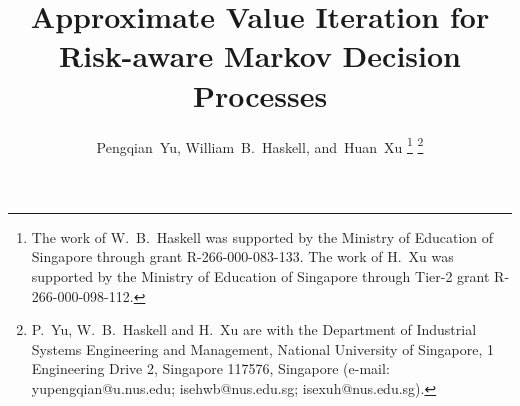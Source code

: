 \documentclass[12pt,technote,onecolumn]{IEEEtran}
\begin{document}
%
\title{Approximate Value Iteration for Risk-aware Markov Decision Processes}
%
%
%

\author{Pengqian~Yu,
        William~B.~Haskell,
        and~Huan~Xu%
\thanks{The work of W.~B.~Haskell was supported by the Ministry of Education of Singapore through grant R-266-000-083-133. The work of H.~Xu was supported by the Ministry of Education of Singapore through Tier-2 grant R-266-000-098-112.}        
\thanks{P.~Yu, W.~B.~Haskell and H.~Xu are with the Department of Industrial Systems Engineering and Management, National University of Singapore, 1 Engineering Drive 2, Singapore 117576, Singapore (e-mail: yupengqian@u.nus.edu; isehwb@nus.edu.sg; isexuh@nus.edu.sg).}}%

% 
%
\end{document}
